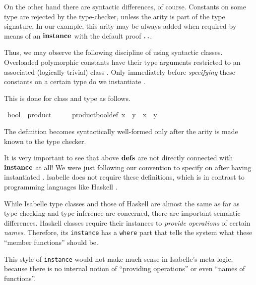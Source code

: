 \begin{isabellebody}
\begin{isamarkuptext}
  On the other hand there are syntactic differences, of course.
  Constants \isa{{\isasymodot}} on some type \isa{{\isasymtau}} are rejected by the
  type-checker, unless the arity  is part of the
  type signature.  In our example, this arity may be always added when
  required by means of an ${\mathord{\mathbf{instance}}}$ with the default proof $\textbf{.\,.}$.

  \medskip Thus, we may observe the following discipline of using
  syntactic classes.  Overloaded polymorphic constants have their type
  arguments restricted to an associated (logically trivial) class
  .  Only immediately before \emph{specifying} these
  constants on a certain type \isa{{\isasymtau}} do we instantiate .

  This is done for class  and type  as
  follows.%
\end{isamarkuptext}%
\isamarkuptrue%
\isamarkupfalse%
\ bool\ {\isacharcolon}{\isacharcolon}\ product%
\isadelimproof
\ %
\endisadelimproof
%
\isatagproof
\isacommand{{\isachardot}{\isachardot}}\isamarkupfalse%
%
\endisatagproof
{\isafoldproof}%
%
\isadelimproof
%
\endisadelimproof
\isanewline
{}\isamarkupfalse%
\ {\isacharparenleft}\isanewline
\ \ product{\isacharunderscore}bool{\isacharunderscore}def{\isacharcolon}\ {\isachardoublequoteopen}x\ {\isasymodot}\ y\ {\isasymequiv}\ x\ {\isasymand}\ y{\isachardoublequoteclose}%
\begin{isamarkuptext}%
The definition  becomes syntactically
 well-formed only after the arity  is made
 known to the type checker.

 \medskip It is very important to see that above ${\mathord{\mathbf{defs}}}$ are not
 directly connected with ${\mathord{\mathbf{instance}}}$ at all!  We were just following
 our convention to specify \isa{{\isasymodot}} on  after having
 instantiated .  Isabelle does not require
 these definitions, which is in contrast to programming languages like
 Haskell \cite{haskell-report}.

 \medskip While Isabelle type classes and those of Haskell are almost
 the same as far as type-checking and type inference are concerned,
 there are important semantic differences.  Haskell classes require
 their instances to \emph{provide operations} of certain \emph{names}.
 Therefore, its \texttt{instance} has a \texttt{where} part that tells
 the system what these ``member functions'' should be.

 This style of \texttt{instance} would not make much sense in
 Isabelle's meta-logic, because there is no internal notion of
 ``providing operations'' or even ``names of functions''.%
\end{isamarkuptext}%
\isamarkuptrue%
%
\isadelimtheory
%
\endisadelimtheory
%
\isatagtheory
{}\isamarkupfalse%
%
\endisatagtheory
{\isafoldtheory}%
%
\isadelimtheory
%
\endisadelimtheory
\isanewline
\end{isabellebody}%
